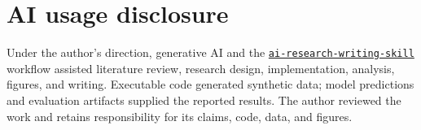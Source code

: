 \section*{AI usage disclosure}
Under the author's direction, generative AI and the \href{https://github.com/jin-s13/ai-research-writing-skill}{\texttt{ai-research-writing-skill}} workflow assisted literature review, research design, implementation, analysis, figures, and writing. Executable code generated synthetic data; model predictions and evaluation artifacts supplied the reported results. The author reviewed the work and retains responsibility for its claims, code, data, and figures.
